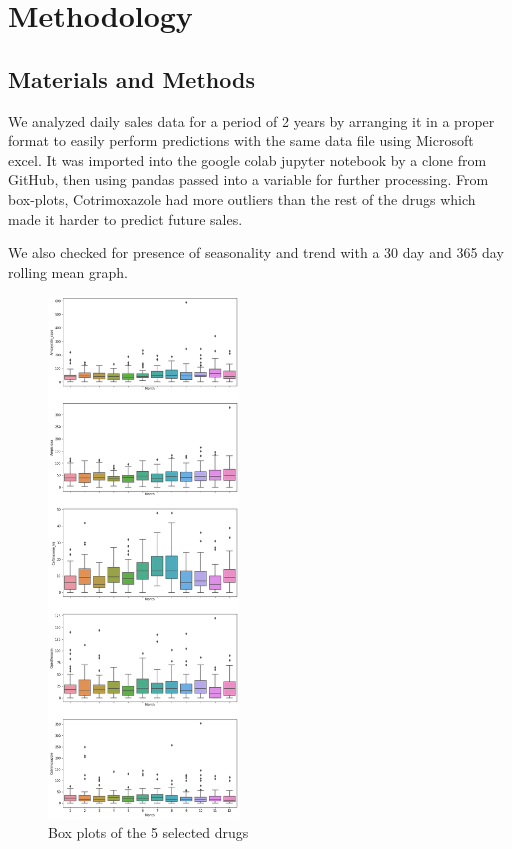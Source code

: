 \documentclass[12pt]{report}
\begin{document}
\chapter{Methodology}

\section{Materials and Methods}

We analyzed daily sales data for a period of 2 years by arranging it in a proper format to easily perform predictions with the same data file using Microsoft excel. 
It was imported into the google colab jupyter notebook by a clone from GitHub, then using pandas passed into a variable for further processing.
From box-plots, Cotrimoxazole had more outliers than the rest of the drugs which made it harder to predict future sales.
 
 We also checked for presence of seasonality and trend with a 30 day and 365 day rolling mean graph. 


\begin{figure}[H]%
  \begin {center}
  \includegraphics[width=0.45\textwidth]{images/download.png}
  \caption{Box plots of the 5 selected drugs}
  \label{fig:ecg}
  \end {center}
\end{figure}
\end{document}
